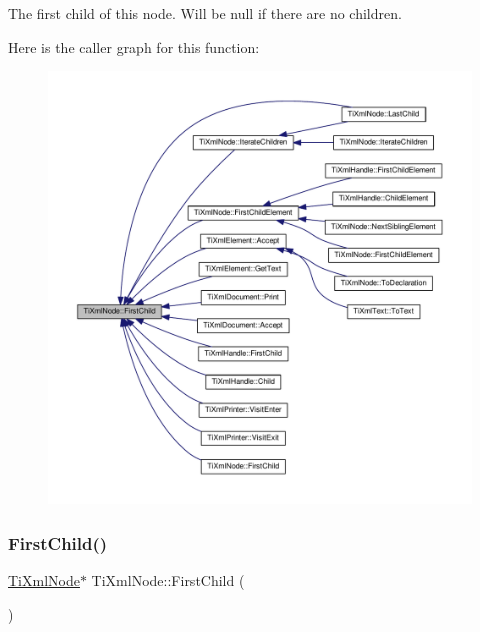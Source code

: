The first child of this node. Will be null if there are no children. 

Here is the caller graph for this function\+:
\nopagebreak
\begin{figure}[H]
\begin{center}
\leavevmode
\includegraphics[width=350pt]{class_ti_xml_node_aa66bceae19707c90c1db12d7c98894a4_icgraph}
\end{center}
\end{figure}
\mbox{\label{class_ti_xml_node_a5e97d69b7c0ebd27fb7286be56559b77}} 
\subsubsection{\texorpdfstring{First\+Child()}{FirstChild()}\hspace{0.1cm}{\footnotesize\ttfamily [2/4]}}
{\footnotesize\ttfamily \hyperlink{class_ti_xml_node}{Ti\+Xml\+Node}$\ast$ Ti\+Xml\+Node\+::\+First\+Child (\begin{DoxyParamCaption}{ }\end{DoxyParamCaption})\hspace{0.3cm}{\ttfamily [inline]}}

